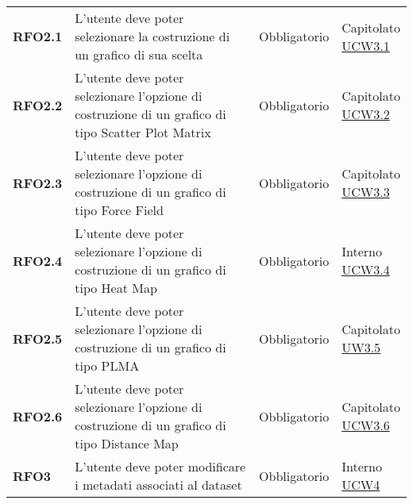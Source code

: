 \begin{longtable}[H]{| >{\raggedright\bfseries}m{20mm} | >{\raggedright}m{90mm} | >{\centering}m{25mm} | >{\centering\arraybackslash}m{30mm}|}
    RFO2.1
     & L'utente deve poter selezionare la costruzione di un grafico di sua scelta
     & Obbligatorio
     & \makecell{ Capitolato                                                                                             \\ \hyperref[ssub:ucw3.1]{UCW3.1}}\\

    RFO2.2
     & L'utente deve poter selezionare l'opzione di costruzione di un grafico di tipo Scatter Plot
    Matrix
     & Obbligatorio
     & \makecell{ Capitolato                                                                                             \\   \hyperref[ssub:ucw3.2]{UCW3.2}}\\

    RFO2.3
     & L'utente deve poter selezionare l'opzione di costruzione di un grafico di tipo Force Field
     & Obbligatorio
     & \makecell{ Capitolato                                                                                             \\  \hyperref[ssub:ucw3.3]{UCW3.3}}\\

    RFO2.4
     & L'utente deve poter selezionare l'opzione di costruzione di un grafico di tipo Heat Map
     & Obbligatorio
     & \makecell{ Interno                                                                                                \\  \hyperref[ssub:ucw3.4]{UCW3.4}}\\

    RFO2.5
     & L'utente deve poter selezionare l'opzione di costruzione di un grafico di tipo PLMA
     & Obbligatorio
     & \makecell{Capitolato                                                                                              \\ \hyperref[ssub:ucw3.5]{UW3.5}}\\

    RFO2.6
     & L'utente deve poter selezionare l'opzione di costruzione di un grafico di tipo Distance Map
     & Obbligatorio
     & \makecell{Capitolato                                                                                              \\ \hyperref[ssub:ucw3.6]{UCW3.6}}\\

    RFO3
     & L'utente deve poter modificare i metadati associati al dataset
     & Obbligatorio
     & \makecell{ Interno                                                                                                \\  \hyperref[sub:ucw4]{UCW4} }\\


\end{longtable}
